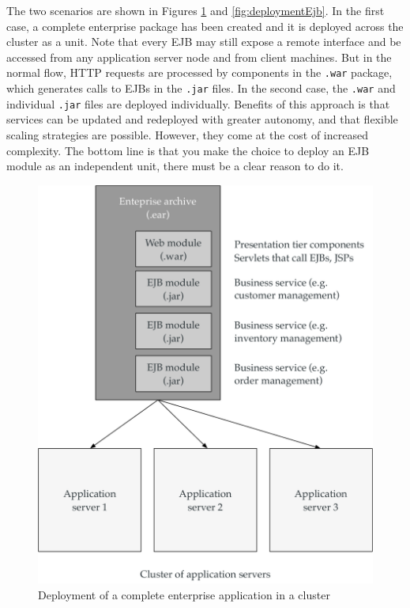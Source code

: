 
The two scenarios are shown in Figures \ref{fig:deploymentEar} and \ref{fig:deploymentEjb}. In the first case, a complete enterprise package has been created and it is deployed across the cluster as a unit. Note that every \ac{EJB} may still expose a remote interface and be accessed from any application server node and from client machines. But in the normal flow, HTTP requests are processed by components in the \texttt{.war} package, which generates calls to \ac{EJB}s in the \texttt{.jar} files. In the second case, the \texttt{.war} and individual \texttt{.jar} files are deployed individually. Benefits of this approach is that services can be updated and redeployed with greater autonomy, and that flexible scaling strategies are possible. However, they come at the cost of increased complexity. The bottom line is that you make the choice to deploy an \ac{EJB} module as an independent unit, there must be a clear reason to do it.
\begin{figure}[]
	\centering
    \includegraphics[width=0.8\linewidth]{Figures/deployment-ear.pdf}
	\caption{Deployment of a complete enterprise application in a cluster}
  \label{fig:deploymentEar}
\end{figure}

